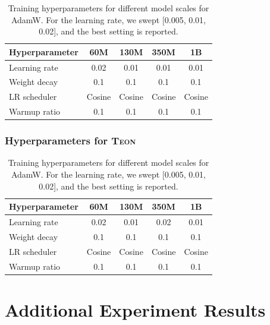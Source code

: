 \documentclass{article}
\theoremstyle{plain}
\theoremstyle{definition}
\theoremstyle{remark}
\begin{document}
\begin{table}[htb]
\centering

\setlength{\tabcolsep}{3.5pt}
\begin{tabular}{lcccc}
\toprule
\textbf{Hyperparameter} 
& \textbf{60M} 
& \textbf{130M} 
& \textbf{350M} 
& \textbf{1B} \\
\midrule
Learning rate  & 0.02 & 0.01 & 0.01 & 0.01 \\
Weight decay   & 0.1 & 0.1 & 0.1 & 0.1 \\
LR scheduler   & Cosine & Cosine & Cosine & Cosine \\
Warmup ratio   & 0.1 & 0.1 & 0.1 & 0.1 \\
\bottomrule
\end{tabular}
\caption{Training hyperparameters for different model scales for AdamW. For the learning rate, we swept [0.005, 0.01, 0.02],  and the best setting is reported.}
\label{tab:training_hparams_llama_adamw}
\end{table}

\subsubsection{Hyperparameters for \textsc{Teon}}

\begin{table}[!htb]
\centering

\setlength{\tabcolsep}{3.5pt}
\begin{tabular}{lcccc}
\toprule
\textbf{Hyperparameter} 
& \textbf{60M} 
& \textbf{130M} 
& \textbf{350M} 
& \textbf{1B} \\
\midrule
Learning rate  & 0.02 & 0.01 & 0.02 & 0.01 \\
Weight decay   & 0.1 & 0.1 & 0.1 & 0.1 \\
LR scheduler   & Cosine & Cosine & Cosine & Cosine \\
Warmup ratio   & 0.1 & 0.1 & 0.1 & 0.1 \\
\bottomrule
\end{tabular}
\caption{Training hyperparameters for different model scales for AdamW. For the learning rate, we swept [0.005, 0.01, 0.02], and the best setting is reported.}
\label{tab:training_hparams_llama_adamw}
\end{table}

\section{Additional Experiment Results}
\end{document}
